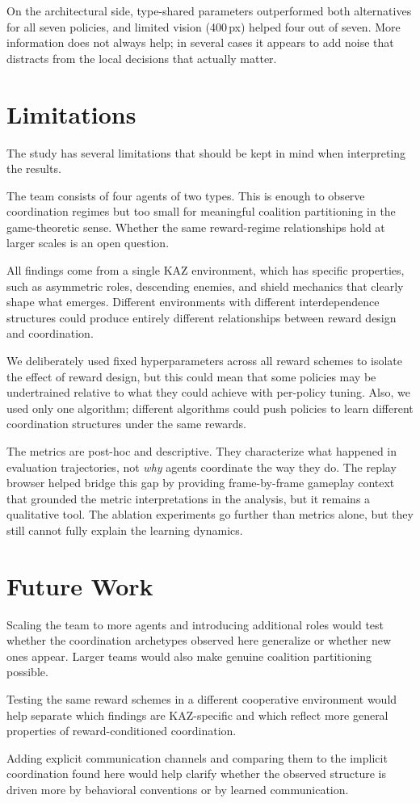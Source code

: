 On the architectural side, type-shared parameters outperformed both alternatives for all seven policies, and limited vision (400\,px) helped four out of seven. More information does not always help; in several cases it appears to add noise that distracts from the local decisions that actually matter.

\section{Limitations}

The study has several limitations that should be kept in mind when interpreting the results.

The team consists of four agents of two types. This is enough to observe coordination regimes but too small for meaningful coalition partitioning in the game-theoretic sense. Whether the same reward-regime relationships hold at larger scales is an open question.

All findings come from a single KAZ environment, which has specific properties, such as asymmetric roles, descending enemies, and shield mechanics that clearly shape what emerges. Different environments with different interdependence structures could produce entirely different relationships between reward design and coordination.

We deliberately used fixed hyperparameters across all reward schemes to isolate the effect of reward design, but this could mean that some policies may be undertrained relative to what they could achieve with per-policy tuning. Also, we used only one algorithm; different algorithms could push policies to learn different coordination structures under the same rewards.

The metrics are post-hoc and descriptive. They characterize what happened in evaluation trajectories, not \emph{why} agents coordinate the way they do. The replay browser helped bridge this gap by providing frame-by-frame gameplay context that grounded the metric interpretations in the analysis, but it remains a qualitative tool. The ablation experiments go further than metrics alone, but they still cannot fully explain the learning dynamics.

\section{Future Work}
Scaling the team to more agents and introducing additional roles would test whether the coordination archetypes observed here generalize or whether new ones appear. Larger teams would also make genuine coalition partitioning possible.

Testing the same reward schemes in a different cooperative environment would help separate which findings are KAZ-specific and which reflect more general properties of reward-conditioned coordination.

Adding explicit communication channels and comparing them to the implicit coordination found here would help clarify whether the observed structure is driven more by behavioral conventions or by learned communication.